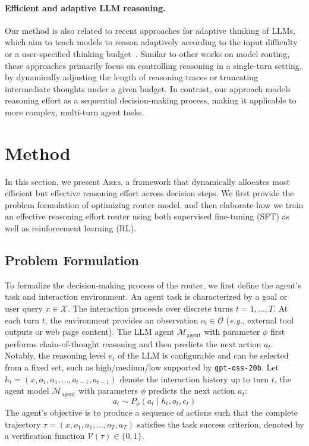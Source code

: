 \documentclass{article}
\newcommand{\ares}{\textsc{Ares}}
\theoremstyle{plain}
\theoremstyle{definition}
\theoremstyle{remark}
\begin{document}
\paragraph{Efficient and adaptive LLM reasoning.} 
Our method is also related to recent approaches for adaptive thinking of LLMs, which aim to teach models to reason adaptively according to the input difficulty~\citep{liu2025diffadapt,yu2025think,wu2025efficiency,zhang2025dart} or a user-specified thinking budget~\citep{huang2025adactrl,alomrani2025reasoning,hou2025thinkprune}. 
Similar to other works on model routing, these approaches primarily focus on controlling reasoning in a single-turn setting, by dynamically adjusting the length of reasoning traces or truncating intermediate thoughts under a given budget. 
In contrast, our approach models reasoning effort as a sequential decision-making process, making it applicable to more complex, multi-turn agent tasks.


\section{Method}
In this section, we present {\ares}, a framework that dynamically allocates most efficient but effective reasoning effort across decision steps. We first provide the problem formulation of optimizing router model, and then elaborate how we train an effective reasoning effort router using both supervised fine-tuning (SFT) as well as reinforcement learning (RL). 

\subsection{Problem Formulation}
\label{sec: formulation}
To formalize the decision-making process of the router, we first define the agent's task and interaction environment. An agent task is characterized by a goal or user query $x \in \mathcal{X}$. The interaction proceeds over discrete turns $t = 1, \dots, T$. At each turn $t$, the environment provides an observation $o_t \in \mathcal{O}$ (\emph{e.g.}, external tool outputs or web page content). The LLM agent $\mathcal{M}_{\text{agent}}$ with parameter $\phi$ first performs chain-of-thought reasoning and then predicts the next action $a_t$. 
Notably, the reasoning level $e_t$ of the LLM is configurable and can be selected from a fixed set, such as high/medium/low supported by \texttt{gpt-oss-20b}.
Let $h_t = (x, o_1, a_1, \dots, o_{t-1}, a_{t-1})$ denote the interaction history up to turn $t$, the agent model $\mathcal{M}_{\text{agent}}$ with parameters $\phi$ predicts the next action $a_t$:
\begin{equation}
    a_t \sim P_\phi(a_t \mid h_t, o_t, e_t)
\end{equation}
The agent's objective is to produce a sequence of actions such that the complete trajectory $\tau = (x, o_1, a_1, \dots, o_T, a_T)$ satisfies the task success criterion, denoted by a verification function $\mathcal{V}(\tau) \in \{0, 1\}$.
\end{document}
